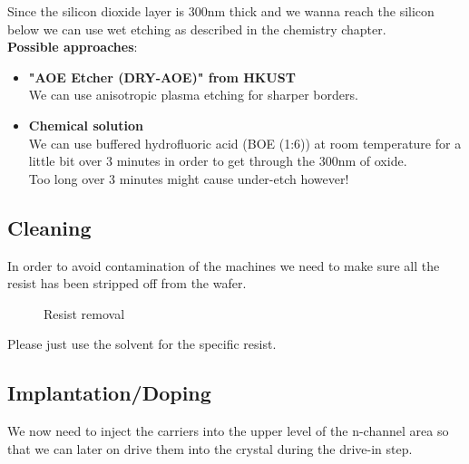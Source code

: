 Since the silicon dioxide layer is 300nm thick and we wanna reach the silicon below we can use wet etching as described in the chemistry chapter.\\

\textbf{Possible approaches}:
\begin{itemize}
	\item \textbf{"AOE Etcher (DRY-AOE)" from HKUST} \\
	We can use anisotropic plasma etching for sharper borders.
	\item \textbf{Chemical solution} \\
	We can use buffered hydrofluoric acid (BOE (1:6)) at room temperature for a little bit over 3 minutes in order to get through the 300nm of oxide.\\
	Too long over 3 minutes might cause under-etch however!
\end{itemize}

\subsection{Cleaning}
In order to avoid contamination of the machines we need to make sure all the resist has been stripped off from the wafer.
\begin{figure}[H]
	\centering
	\begin{tikzpicture}[node distance = 3cm, auto, thick,scale=\CrossSectionOnly, every node/.style={transform shape}]
		
	\end{tikzpicture}
	\drawStepArrow{}
	\begin{tikzpicture}[node distance = 3cm, auto, thick,scale=\CrossSectionOnly, every node/.style={transform shape}]
		
	\end{tikzpicture}
	\caption{Resist removal}
\end{figure}
Please just use the solvent for the specific resist.

\newpage

\subsection{Implantation/Doping}\label{nwell_implant_step}
We now need to inject the carriers into the upper level of the n-channel area so that we can later on drive them into the crystal during the drive-in step.

